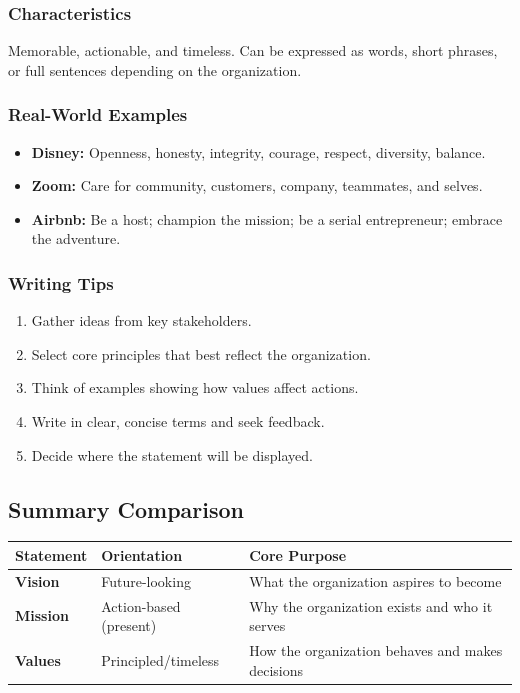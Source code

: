 \documentclass[11pt, letterpaper]{article}
\begin{document}
\subsubsection{Characteristics}
Memorable, actionable, and timeless. Can be expressed as words, short phrases, or full sentences depending on the organization.

\subsubsection{Real-World Examples}
\begin{itemize}[leftmargin=*]
  \item \textbf{Disney:} Openness, honesty, integrity, courage, respect, diversity, balance.
  \item \textbf{Zoom:} Care for community, customers, company, teammates, and selves.
  \item \textbf{Airbnb:} Be a host; champion the mission; be a serial entrepreneur; embrace the adventure.
\end{itemize}

\subsubsection{Writing Tips}
\begin{enumerate}[leftmargin=*, label=\arabic*.]
  \item Gather ideas from key stakeholders.
  \item Select core principles that best reflect the organization.
  \item Think of examples showing how values affect actions.
  \item Write in clear, concise terms and seek feedback.
  \item Decide where the statement will be displayed.
\end{enumerate}

\subsection{Summary Comparison}

\begin{center}
\begin{tabular}{>{\bfseries}p{2.5cm} p{3.5cm} p{6.5cm}}
\toprule
Statement & Orientation & Core Purpose \\
\midrule
Vision & Future-looking & What the organization aspires to become \\
\addlinespace
Mission & Action-based (present) & Why the organization exists and who it serves \\
\addlinespace
Values & Principled/timeless & How the organization behaves and makes decisions \\
\bottomrule
\end{tabular}
\end{center}
\end{document}
